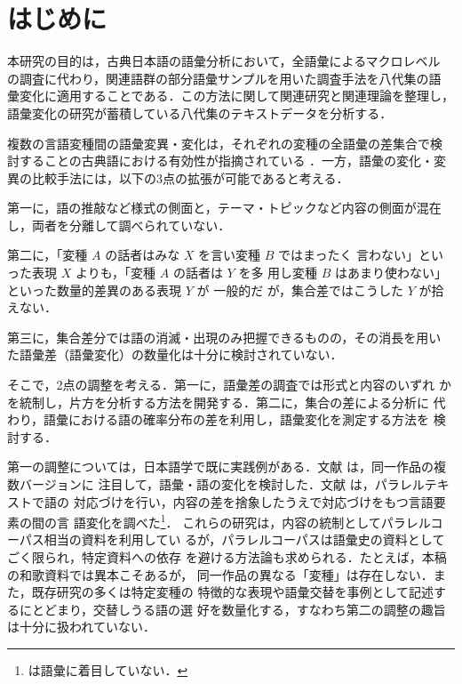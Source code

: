 \documentclass[submit]{ipsj}
\begin{document}
\maketitle
\section{はじめに\label{orgf9e6dd6}}
\label{sec:org54b6d81}
本研究の目的は，古典日本語の語彙分析において，全語彙によるマクロレベル
の調査に代わり，関連語群の部分語彙サンプルを用いた調査手法を八代集の語
彙変化に適用することである．この方法に関して関連研究と関連理論を整理し，
語彙変化の研究が蓄積している八代集のテキストデータを分析する．

複数の言語変種間の語彙変異・変化は，それぞれの変種の全語彙の差集合で検
討することの古典語における有効性が指摘されている
\cite{kondo2011Heian,tsukishima1992Kunten}．一方，語彙の変化・変
異の比較手法には，以下の3点の拡張が可能であると考える．

第一に，語の推敲など様式の側面と，テーマ・トピックなど内容の側面が混在
し，両者を分離して調べられていない．

第二に，「変種 \(A\) の話者はみな \(X\) を言い変種 \(B\) ではまったく
言わない」といった表現 \(X\) よりも，「変種 \(A\) の話者は \(Y\) を多
用し変種 \(B\) はあまり使わない」といった数量的差異のある表現 \(Y\) が
一般的だ \cite{Wolfram2004Social} が，集合差ではこうした \(Y\)
が拾えない．

第三に，集合差分では語の消滅・出現のみ把握できるものの，その消長を用い
た語彙差（語彙変化）の数量化は十分に検討されていない．

そこで，2点の調整を考える．第一に，語彙差の調査では形式と内容のいずれ
かを統制し，片方を分析する方法を開発する．第二に，集合の差による分析に
代わり，語彙における語の確率分布の差を利用し，語彙変化を測定する方法を
検討する．

第一の調整については，日本語学で既に実践例がある．文献 \cite{miyazima1979Kyosanto,hasumi1991Ichi} は，同一作品の複数バージョンに
注目して，語彙・語の変化を検討した．文献 \cite{kitasaki2024Heike,kitasaki2015Sharebon,tanaka2014Konjaku} は，パラレルテキストで語の
対応づけを行い，内容の差を捨象したうえで対応づけをもつ言語要素の間の言
語変化を調べた\footnote{\cite{kitasaki2024Heike} は語彙に着目していない．}．
これらの研究は，内容の統制としてパラレルコーパス相当の資料を利用してい
るが，パラレルコーパスは語彙史の資料としてごく限られ，特定資料への依存
を避ける方法論も求められる．たとえば，本稿の和歌資料では異本こそあるが，
同一作品の異なる「変種」は存在しない．また，既存研究の多くは特定変種の
特徴的な表現や語彙交替を事例として記述するにとどまり，交替しうる語の選
好を数量化する，すなわち第二の調整の趣旨は十分に扱われていない．
\end{document}
